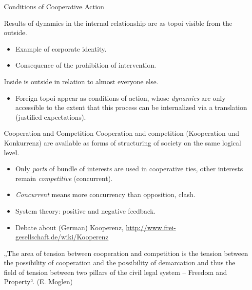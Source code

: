 \documentclass{beamer}
\begin{document}
\begin{frame}{Conditions of Cooperative Action}
  
Results of dynamics in the internal relationship are as topoi visible from the
outside.
\begin{itemize}
\item Example of corporate identity.
\item Consequence of the prohibition of intervention.
\end{itemize}
Inside is outside in relation to almost everyone else.
\begin{itemize}
\item Foreign topoi appear as conditions of action, whose \emph{dynamics} are
  only accessible to the extent that this process can be internalized via a
  translation (justified expectations).
\end{itemize}
\end{frame}

\begin{frame}{Cooperation and Competition}
Cooperation and competition (Kooperation und Konkurrenz) are available as
forms of structuring of society on the same logical level.
\begin{itemize}
\item Only \emph{parts} of bundle of interests are used in cooperative ties,
  other interests remain \emph{competitive} (concurrent).
\item \emph{Concurrent} means more concurrency than opposition, clash.
\item System theory: positive and negative feedback.
\item Debate about (German) Kooperenz,
  \url{http://www.frei-gesellschaft.de/wiki/Kooperenz}
\end{itemize}
„The area of tension between cooperation and competition is the tension
between the possibility of cooperation and the possibility of demarcation and
thus the field of tension between two pillars of the civil legal system --
Freedom and Property“. (E. Moglen)
\end{frame}
\end{document}
